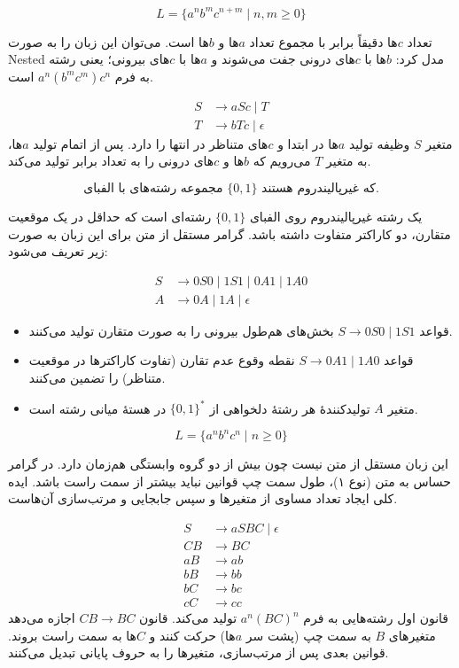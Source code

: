 \[
L = \{a^n b^m c^{n+m} \mid n, m \ge 0\}
\]

تعداد $c$ها دقیقاً برابر با مجموع تعداد $a$ها و $b$ها است. می‌توان این زبان را به صورت Nested مدل کرد: $b$ها با $c$های درونی جفت می‌شوند و $a$ها با $c$های بیرونی؛ یعنی رشته به فرم $a^n (b^m c^m) c^n$ است.

\begin{align*}
    S &\rightarrow aSc \mid T \\
    T &\rightarrow bTc \mid \epsilon
\end{align*}
متغیر $S$ وظیفه تولید $a$ها در ابتدا و $c$های متناظر در انتها را دارد. پس از اتمام تولید $a$ها، به متغیر $T$ می‌رویم که $b$ها و $c$های درونی را به تعداد برابر تولید می‌کند.

\[
\text{مجموعه رشته‌های با الفبای $\{0, 1\}$ که غیرپالیندروم هستند.}
\]


یک رشته غیرپالیندروم روی الفبای $\{0, 1\}$ رشته‌ای است که حداقل در یک موقعیت متقارن، دو کاراکتر متفاوت داشته باشد. گرامر مستقل از متن برای این زبان به صورت زیر تعریف می‌شود:

\begin{align*}
    S &\rightarrow 0S0 \mid 1S1 \mid 0A1 \mid 1A0 \\
    A &\rightarrow 0A \mid 1A \mid \epsilon
\end{align*}

\begin{itemize}
    \item قواعد $S \rightarrow 0S0 \mid 1S1$ بخش‌های هم‌طول بیرونی را به صورت متقارن تولید می‌کنند.
    \item قواعد $S \rightarrow 0A1 \mid 1A0$ نقطه وقوع عدم تقارن (تفاوت کاراکترها در موقعیت متناظر) را تضمین می‌کنند.
    \item متغیر $A$ تولیدکنندهٔ هر رشتهٔ دلخواهی از $\{0, 1\}^*$ در هستهٔ میانی رشته است.
\end{itemize}


\[
    L = \{a^n b^n c^n \mid n \ge 0\}
    \]

این زبان مستقل از متن نیست چون بیش از دو گروه وابستگی هم‌زمان دارد. در گرامر حساس به متن (نوع ۱)، طول سمت چپ قوانین نباید بیشتر از سمت راست باشد. ایده کلی ایجاد تعداد مساوی از متغیرها و سپس جابجایی و مرتب‌سازی آن‌هاست.

\begin{align*}
    S &\rightarrow aSBC \mid \epsilon \\
    CB &\rightarrow BC \\
    aB &\rightarrow ab \\
    bB &\rightarrow bb \\
    bC &\rightarrow bc \\
    cC &\rightarrow cc
\end{align*}
قانون اول رشته‌هایی به فرم $a^n(BC)^n$ تولید می‌کند. قانون $CB \rightarrow BC$ اجازه می‌دهد متغیرهای $B$ به سمت چپ (پشت سر $a$ها) حرکت کنند و $C$ها به سمت راست بروند. قوانین بعدی پس از مرتب‌سازی، متغیرها را به حروف پایانی تبدیل می‌کنند.

